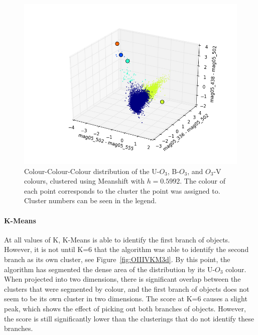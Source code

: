 \begin{figure}
\centering
\includegraphics[width=\linewidth]{figs/meanshift_3d_color_5cl_mag05_502-mag05_555vsmag05_336-mag05_502vsmag05_438-mag05_502}
\caption{Colour-Colour-Colour distribution of the U-$O_{3}$, B-$O_{3}$, and $O_{3}$-V colours, clustered using Meanshift with $h=0.5992$. The colour of each point corresponds to the cluster the point was assigned to. Cluster numbers can be seen in the legend.}
\label{fig:fig:OIIIVMS3d}
\end{figure}

\paragraph{K-Means}
At all values of K, K-Means is able to identify the first branch of objects. However, it is not until K=6 that the algorithm was able to identify the second branch as its own cluster, see Figure~\ref{fig:OIIIVKM3d}.
By this point, the algorithm has segmented the dense area of the distribution by its U-$O_{3}$ colour.
When projected into two dimensions, there is significant overlap between the clusters that were segmented by colour, and the first branch of objects does not seem to be its own cluster in two dimensions.
The score at K=6 causes a slight peak, which shows the effect of picking out both branches of objects.
However, the score is still significantly lower than the clusterings that do not identify these branches.

